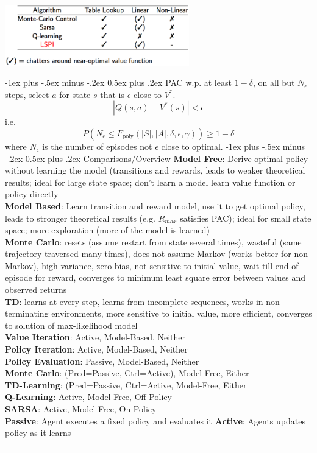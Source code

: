 \documentclass[10pt,landscape]{article}
\makeatletter
\renewcommand{\section}{\@startsection{section}{1}{0mm}%
                                {-1ex plus -.5ex minus -.2ex}%
                                {0.5ex plus .2ex}%
                                {\normalfont\large\bfseries}}
\makeatother
\begin{document}
\begin{multicols}{3}
\includegraphics[width=8cm]{pics/ls_control_converg.png}



\section{PAC}
w.p. at least $1 - \delta$, on all but $N_\epsilon$ steps, select $a$ for state $s$ that is $\epsilon$-close to $V^*$.
	$$|Q(s,a) - V^*(s)| < \epsilon$$
i.e.
    $$P(N_\epsilon \leq F_\mathrm{poly}(|S|, |A|, \delta, \epsilon, \gamma)) \geq 1 - \delta$$
where $N_\epsilon$ is the number of episodes not $\epsilon$ close to optimal.
\section{Comparisons/Overview}
\textbf{Model Free}: Derive optimal policy without learning the model (transitions and rewards, leads to weaker theoretical results; ideal for large state space; don’t learn a model learn value function or policy directly\\
\textbf{Model Based}: Learn transition and reward model, use it to get
optimal policy, leads to stronger theoretical results (e.g. $R_{max}$ satisfies PAC); ideal for small state space; more exploration (more of the model is learned)\\
\textbf{Monte Carlo}: resets (assume restart from state several times), wasteful (same trajectory traversed many times), does not assume Markov (works better for non-Markov), high variance, zero bias, not sensitive to initial value, wait till end of episode for reward, converges to minimum least square error between values and observed returns \\
\textbf{TD}: learns at every step, learns from incomplete sequences, works in non-terminating environments, more sensitive to initial value, more efficient, converges to solution of max-likelihood model \\


\textbf{Value Iteration}: Active, Model-Based, Neither \\
\textbf{Policy Iteration}: Active, Model-Based, Neither \\
\textbf{Policy Evaluation}: Passive, Model-Based, Neither \\
\textbf{Monte Carlo}: (Pred=Passive, Ctrl=Active), Model-Free, Either \\
\textbf{TD-Learning}: (Pred=Passive, Ctrl=Active, Model-Free, Either \\
\textbf{Q-Learning}: Active, Model-Free, Off-Policy \\
\textbf{SARSA}: Active, Model-Free, On-Policy \\

\textbf{Passive}: Agent executes a fixed policy and evaluates it
\textbf{Active}: Agents updates policy as it learns \\


\rule{0.3\linewidth}{0.25pt}
\scriptsize


\end{multicols}
\end{document}
